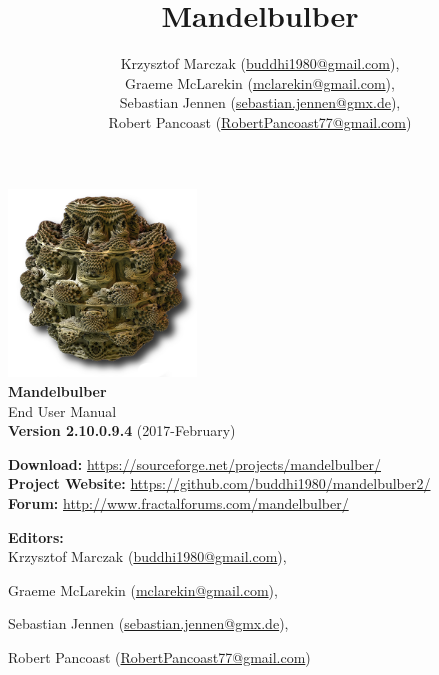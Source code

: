 % 
%




\newcommand{\mTitle}{Mandelbulber}
\newcommand{\mSubtitle}{End User Manual}
\newcommand{\mVersionDocument}{2.10.0.9.4}
\newcommand{\mDateDocument}{2017-February}
\newcommand{\mAuthor}{
	
Krzysztof Marczak (\href{mailto:buddhi1980@gmail.com}{buddhi1980@gmail.com}),

Graeme McLarekin (\href{mailto:mclarekin@gmail.com}{mclarekin@gmail.com}),

Sebastian Jennen (\href{mailto:sebastian.jennen@gmx.de}{sebastian.jennen@gmx.de}),

Robert Pancoast (\href{mailto:RobertPancoast77@gmail.com}{RobertPancoast77@gmail.com})}


\title{\mTitle}
\author{\mAuthor}




\begin{titlepage}
	\begin{center}
		\vspace{1.5cm}
			\includegraphics[width=5cm]{img/mandelbulber_logo.png} \\
		\vspace{0.5cm}
		\Huge\textbf{\mTitle}\\
		\Huge\mSubtitle\\
		\vspace{1.5cm}
		\large\textbf{Version \mVersionDocument} (\mDateDocument)\\
		\vspace{1.5cm}
	\end{center}
	\normalsize
	\begin{flushleft}
			\textbf{Download:} \url{https://sourceforge.net/projects/mandelbulber/}\\
			\textbf{Project Website:} \url{https://github.com/buddhi1980/mandelbulber2/}\\
			\textbf{Forum:} \url{http://www.fractalforums.com/mandelbulber/}\\
	\end{flushleft}
	\vspace{2cm}
	\textbf{Editors:}\\
	\mAuthor\\
	\vfill
\end{titlepage}

